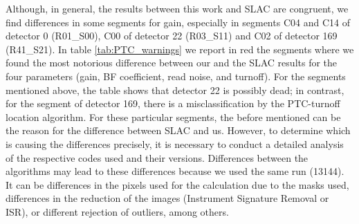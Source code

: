 
Although, in general, the results between this work and SLAC are congruent, we find differences in some segments for gain, especially in segments C04 and C14 of detector 0 (R01\_S00), C00 of detector 22 (R03\_S11) and C02 of detector 169 (R41\_S21). In table \ref{tab:PTC_warnings} we report in red the segments where we found the most notorious difference between our and the SLAC results for the four parameters (gain, BF coefficient, read noise, and turnoff). For the segments mentioned above, the table shows that detector 22 is possibly dead; in contrast, for the segment of detector 169, there is a misclassification by the PTC-turnoff location algorithm. For these particular segments, the before mentioned can be the reason for the difference between SLAC and us. However, to determine which is causing the differences precisely, it is necessary to conduct a detailed analysis of the respective codes used and their versions. Differences between the algorithms may lead to these differences because we used the same run (13144). It can be differences in the pixels used for the calculation due to the masks used, differences in the reduction of the images (Instrument Signature Removal or ISR), or different rejection of outliers, among others. 


\vspace{3mm}


